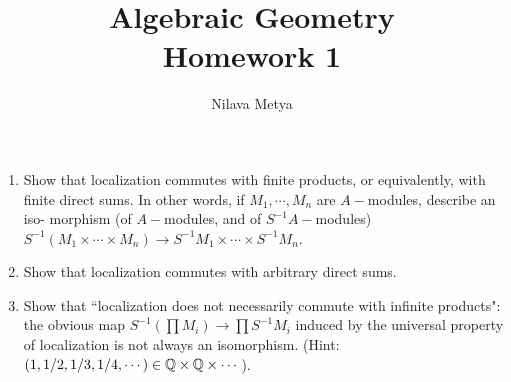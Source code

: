 
\usepackage{quiver}
\usepackage{listings}
\usepackage{fancyvrb,xcolor}
\usepackage{tcolorbox}
\usepackage{tabto}
\usepackage{wrapfig}
\newcommand{\catname}[1]{{\normalfont\textbf{#1}}}
\newcommand{\Set}{\catname{\sffamily Set }}
\newcommand{\Ring}{\catname{\sffamily Ring }}
\newcommand{\Group}{\catname{\sffamily Group }}
\newcommand{\pb}[2]{
\begin{tcolorbox}[
width=\textwidth,
colback={skybl},
title={#1},
]  
#2
\end{tcolorbox} 
}
\newcommand{\w}{\wedge}
\title{\vspace{-1in}\textbf{Algebraic Geometry}\\{Homework 1}}
\author{\vspace{-2in}Nilava Metya}
\date{\vspace{-0.2in}}


\maketitle



\pb{1}{ 
\begin{enumerate}[label=(\alph*), leftmargin = 20pt]
\item Show that localization commutes with finite products, or equivalently, with finite direct sums. In other words, if $M_1 ,\cdots, M_n$ are $A-$modules, describe an iso-
morphism (of $A-$modules, and of $S^{-1}A-$modules) $S^{-1}(M_1 \times \cdots \times M_n) \to S^{-1}M_1 \times \cdots \times S^{-1}M_n$.
\item Show that localization commutes with arbitrary direct sums.
\item Show that ``localization does not necessarily commute with infinite products":
the obvious map $S^{-1}\left(\prod M_i\right) \to \prod S^{-1}M_i$ induced by the universal property of
localization is not always an isomorphism. (Hint: $\left(1, 1/2, 1/3, 1/4,\cdots \right) \in \mathbb{Q} \times \mathbb{Q} \times \cdots$).
\end{enumerate}
}




